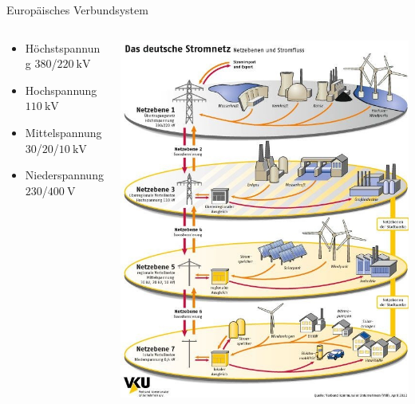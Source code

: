 \documentclass[aspectratio=1610, professionalfonts, 9pt]{beamer}
\begin{document}
\begin{frame}{Europäisches Verbundsystem}
\end{frame}
{
\begin{frame}
  \begin{columns}

  \begin{column}{0.5\textwidth}
\begin{itemize}
  \item Höchstspannung $\num{380}$/$\SI{220}{\kilo\volt}$
  \item Hochspannung  $\SI{110}{\kilo\volt}$
  \item Mittelspannung  $\num{30}$/$\num{20}$/$\SI{10}{\kilo\volt}$
  \item Niederspannung $\num{230}$/$\SI{400}{\volt}$
\end{itemize}
\end{column}
\begin{column}{0.5\textwidth}
\includegraphics[width=1\textwidth]{images/netzebenen.jpg}
\end{column}
\end{columns}
\end{frame}
}
\end{document}
